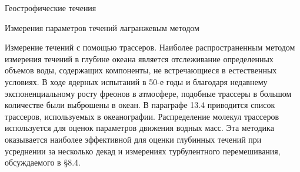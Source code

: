 \begin{chapter}{Геострофические течения}
\begin{section}{Измерения параметров течений лагранжевым методом}
\begin{paragraph}{Измерение течений с помощью трассеров.}
Наиболее распространенным методом измерения течений в глубине океана
является отслеживание определенных объемов воды, содержащих
компоненты, не встречающиеся в естественных условиях. В ходе ядерных
испытаний в 50-е годы и благодаря недавнему экспоненциальному росту
фреонов в атмосфере, подобные трассеры в большом количестве были
выброшены в океан. В параграфе 13.4 приводится список трассеров,
используемых в океанографии. Распределение молекул трассеров
используется для оценок параметров движения водных масс. Эта методика
оказывается наиболее эффективной для оценки глубинных течений при
усреднении за несколько декад и измерениях турбулентного
перемешивания, обсуждаемого в \S8.4.
%


\end{paragraph}
\end{section}
\end{chapter}
